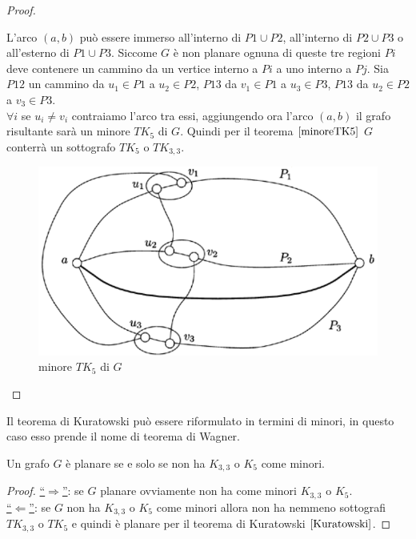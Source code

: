 \begin{teorema}
\begin{proof}
\begin{enumerate}
            L'arco \((a,b)\) può essere immerso all'interno di \(P1 \cup P2\), all'interno di \(P2 \cup P3\) o all'esterno di \(P1 \cup P3\). Siccome \(G\) è non planare ognuna di queste tre regioni \(Pi\) deve contenere un cammino da un vertice interno a \(Pi\) a uno interno a \(Pj\). Sia \(P12\) un cammino da \(u_1 \in P1\) a \(u_2 \in P2\), \(P13\) da \(v_1 \in P1\) a \(u_3 \in P3\), \(P13\) da \(u_2 \in P2\) a \(v_3 \in P3\).\\
            \(\forall i\) se \(u_i \neq v_i\) contraiamo l'arco tra essi, aggiungendo ora l'arco \((a,b)\) il grafo risultante sarà un minore \(TK_5\) di \(G\). Quindi per il teorema \(\ref{minoreTK5}\) \(G\) conterrà un sottografo \(TK_5\) o \(TK_{3,3}\).
            \begin{figure}[H]
                \centering
                \includegraphics[scale=0.6]{img/minoreTK5.PNG}
                \caption{minore \(TK_5\) di \(G\)}
            \end{figure}
        \end{enumerate}
    \end{proof}
\end{teorema}
Il teorema di Kuratowski può essere riformulato in termini di minori, in questo caso esso prende il nome di teorema di Wagner.
\begin{teorema}
    Un grafo \(G\) è planare se e solo se non ha \(K_{3,3}\) o \(K_5\) come minori.
    \begin{proof}
        \underline{“\(\Rightarrow\)”}: se \(G\) planare ovviamente non ha come minori \(K_{3,3}\) o \(K_5\). \\
        \underline{“\(\Leftarrow\)”}: se \(G\) non ha \(K_{3,3}\) o \(K_5\) come minori allora non ha nemmeno sottografi \(TK_{3,3}\) o \(TK_5\) e quindi è planare per il teorema di Kuratowski \(\ref{Kuratowski}\).
    \end{proof}
\end{teorema}